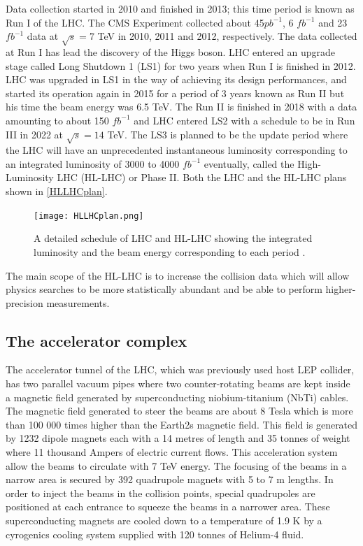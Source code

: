 Data collection started in 2010 and finished in 2013; this time period is known as Run I of the LHC. The CMS Experiment collected about 45$pb^{-1}$, 6 $fb^{-1}$ and 23 $fb^{-1}$ data at $\sqrt{s}=7$ TeV in 2010, 2011 and 2012, respectively. The data collected at Run I has lead the discovery of the Higgs boson. LHC entered an upgrade stage called Long Shutdown 1 (LS1) for two years when Run I is finished in 2012. LHC was upgraded in LS1 in the way of achieving its design performances, and started its operation again in 2015 for a period of 3 years known as Run II but his time the beam energy was 6.5 TeV. The Run II is finished in 2018 with a data amounting to about 150 $fb^{-1}$ and LHC entered LS2 with a schedule to be in Run III in 2022 at $\sqrt{s}=14$ TeV. The LS3 is planned to be the update period where the LHC will have an unprecedented instantaneous luminosity corresponding to an integrated luminosity of 3000 to 4000 $fb^{-1}$ eventually, called the High-Luminosity LHC (HL-LHC) or Phase II. Both the LHC and the HL-LHC plans shown in \autoref{HLLHCplan}.

\begin{figure}[ht]
	\centering
	\texttt{[image: HLLHCplan.png]}
	\vspace{2mm}
	\caption[A detailed schedule of LHC and HL-LHC showing the integrated luminosity and the beam energy corresponding to each period.]
	{A detailed schedule of LHC and HL-LHC showing the integrated luminosity and the beam energy corresponding to each period \cite{Apollinari:2284929}.}
	\label{HLLHCplan}
\end{figure}

The main scope of the HL-LHC is to increase the collision data which will allow physics searches to be more statistically abundant and be able to perform higher-precision measurements.

\subsection{The accelerator complex}

The accelerator tunnel of the LHC, which was previously used host LEP collider, has two parallel vacuum pipes where two counter-rotating beams are kept inside a magnetic field generated by superconducting niobium-titanium (NbTi) cables. The magnetic field generated to steer the beams are about 8 Tesla which is more than 100 000 times higher than the Earth2s magnetic field. This field is generated by  1232 dipole magnets each with a 14 metres of length and 35 tonnes of weight where 11 thousand Ampers of electric current flows. This acceleration system allow the beams to circulate with 7 TeV energy. The focusing of the beams in a narrow area is secured by 392 quadrupole magnets with 5 to 7 m lengths. In order to inject the beams in the collision points, special quadrupoles are positioned at each entrance to squeeze the beams in a narrower area. These superconducting magnets are cooled down to a temperature of 1.9 K by a cyrogenics cooling system supplied with 120 tonnes of Helium-4 fluid.

